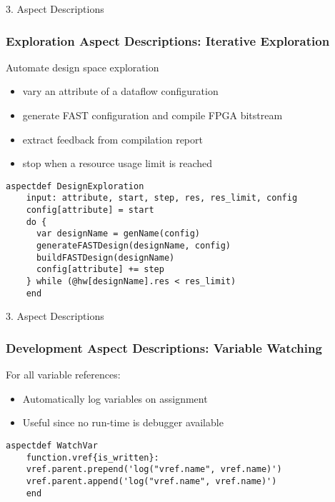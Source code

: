 \begin{frame}[fragile]{3. Aspect Descriptions}
  \frametitle{Exploration Aspect Descriptions: Iterative Exploration}
  Automate design space exploration
  \begin{itemize}
  \item vary an attribute of a dataflow configuration
  \item generate FAST configuration and compile FPGA bitstream
  \item extract feedback from compilation report
  \item stop when a resource usage limit is reached
  \end{itemize}
  \begin{lstlisting}[label=lst:label, style=lara]
    aspectdef DesignExploration
    input: attribute, start, step, res, res_limit, config
    config[attribute] = start
    do {
      var designName = genName(config)
      generateFASTDesign(designName, config)
      buildFASTDesign(designName)
      config[attribute] += step
    } while (@hw[designName].res < res_limit)
    end
  \end{lstlisting}
\end{frame}

\begin{frame}[fragile]{3. Aspect Descriptions}
  \frametitle{Development Aspect Descriptions: Variable Watching}
  For all variable references:
  \begin{itemize}
  \item Automatically log variables on assignment
  \item Useful since no run-time is debugger available
  \end{itemize}
  \begin{lstlisting}[label=lst:label, style=lara]
    aspectdef WatchVar
    function.vref{is_written}:
    vref.parent.prepend('log("vref.name", vref.name)')
    vref.parent.append('log("vref.name", vref.name)')
    end
  \end{lstlisting}
\end{frame}
